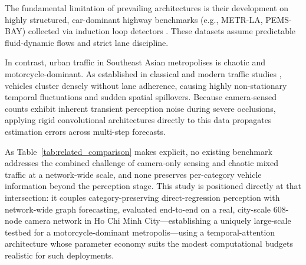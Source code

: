 \documentclass[a4paper,fleqn]{cas-sc}
\begin{document}
The fundamental limitation of prevailing architectures is their development on highly structured, car-dominant highway benchmarks (e.g., METR-LA, PEMS-BAY) collected via induction loop detectors \cite{dcrnn, stgcn}. These datasets assume predictable fluid-dynamic flows and strict lane discipline.

In contrast, urban traffic in Southeast Asian metropolises is chaotic and motorcycle-dominant. As established in classical and modern traffic studies \cite{cao2007, lee2009, mixedtraffic_stgnn}, vehicles cluster densely without lane adherence, causing highly non-stationary temporal fluctuations and sudden spatial spillovers. Because camera-sensed counts exhibit inherent transient perception noise during severe occlusions, applying rigid convolutional architectures directly to this data propagates estimation errors across multi-step forecasts.

As Table~\ref{tab:related_comparison} makes explicit, no existing benchmark addresses the combined challenge of camera-only sensing and chaotic mixed traffic at a network-wide scale, and none preserves per-category vehicle information beyond the perception stage. This study is positioned directly at that intersection: it couples category-preserving direct-regression perception with network-wide graph forecasting, evaluated end-to-end on a real, city-scale 608-node camera network in Ho Chi Minh City---establishing a uniquely large-scale testbed for a motorcycle-dominant metropolis---using a temporal-attention architecture whose parameter economy suits the modest computational budgets realistic for such deployments.

\end{document}
